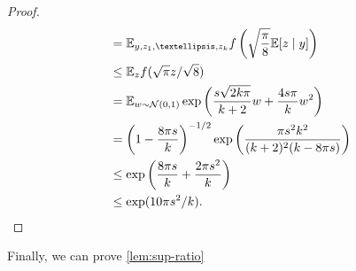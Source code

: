 \documentclass[11pt]{article}
\numberwithin{equation}{section}
\theoremstyle{definition}
\theoremstyle{remark}
\newcommand{\mb}{\mathbb}
\newcommand{\mc}{\mathcal}
\begin{document}
\begin{proof}
\begin{align*}
&= \mb{E}_{y,z_1,\dots,z_k} f\left(\sqrt{\frac{\pi}{8}}\mb{E}[z \mid y]\right)\\
&\le \mb{E}_{z}f(\sqrt{\pi}z/\sqrt{8})\\
&= \mb{E}_{w\sim\mc{N}(0,1)}\exp\bigg(\frac{s\sqrt{2k\pi}}{k+2}w+\frac{4s\pi}{k}w^2\bigg)\\
&= \bigg(1-\frac{8\pi s}{k}\bigg)^{-1/2}\exp\bigg(\frac{\pi s^2k^2}{(k+2)^2(k-8\pi s)}\bigg)\\
&\le\exp\bigg(\frac{8\pi s}{k} + \frac{2\pi s^2}{k}\bigg) \\
&\le\exp(10\pi s^2/k).\qedhere
\end{align*}
\end{proof}

Finally, we can prove \cref{lem:sup-ratio}
\end{document}
